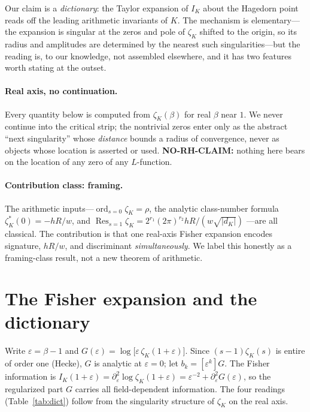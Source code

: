 \documentclass[a4paper,11pt]{article}
\theoremstyle{plain}
\theoremstyle{definition}
\theoremstyle{remark}
\newcommand{\eps}{\varepsilon}
\newcommand{\Res}{\operatorname{Res}}
\newcommand{\ord}{\operatorname{ord}}
\begin{document}
Our claim is a \emph{dictionary}: the Taylor expansion of $I_K$ about the Hagedorn point reads off the
leading arithmetic invariants of $K$. The mechanism is elementary---the expansion is singular at the zeros
and pole of $\zeta_K$ shifted to the origin, so its radius and amplitudes are determined by the nearest such
singularities---but the reading is, to our knowledge, not assembled elsewhere, and it has two features worth
stating at the outset.

\paragraph{Real axis, no continuation.} Every quantity below is computed from $\zeta_K(\beta)$ for real
$\beta$ near $1$. We never continue into the critical strip; the nontrivial zeros enter only as the abstract
``next singularity'' whose \emph{distance} bounds a radius of convergence, never as objects whose location
is asserted or used. \textbf{NO-RH-CLAIM:} nothing here bears on the location of any zero of any $L$-function.

\paragraph{Contribution class: framing.} The arithmetic inputs---$\ord_{s=0}\zeta_K=\rho$, the analytic
class-number formula $\zeta_K^*(0)=-hR/w$, and $\Res_{s=1}\zeta_K=2^{r_1}(2\pi)^{r_2}hR/(w\sqrt{|d_K|})$
\cite{neukirch,iwaniec-kowalski}---are all classical. The contribution is that one real-axis Fisher
expansion encodes signature, $hR/w$, and discriminant \emph{simultaneously}. We label this honestly as a
framing-class result, not a new theorem of arithmetic.

\section{The Fisher expansion and the dictionary}\label{sec:dict}
Write $\eps=\beta-1$ and $G(\eps)=\log\big[\eps\,\zeta_K(1+\eps)\big]$. Since $(s-1)\zeta_K(s)$ is entire of
order one (Hecke), $G$ is analytic at $\eps=0$; let $b_k=[\eps^k]G$. The Fisher information is
$I_K(1+\eps)=\partial_\eps^2\log\zeta_K(1+\eps)=\eps^{-2}+\partial_\eps^2 G(\eps)$, so the regularized part
$G$ carries all field-dependent information. The four readings (Table~\ref{tab:dict}) follow from the
singularity structure of $\zeta_K$ on the real axis.
\end{document}
